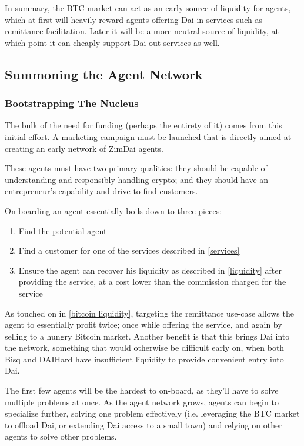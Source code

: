 \documentclass{article}
\begin{document}
In summary, the BTC market can act as an early source of liquidity for agents, which at first will heavily reward agents offering Dai-in services such as remittance facilitation. Later it will be a more neutral source of liquidity, at which point it can cheaply support Dai-out services as well.

\subsection{Summoning the Agent Network} \label{summoning}

\subsubsection{Bootstrapping The Nucleus} \label{bootstrapping}

The bulk of the need for funding (perhaps the entirety of it) comes from this initial effort. A marketing campaign must be launched that is directly aimed at creating an early network of ZimDai agents.

These agents must have two primary qualities: they should be capable of understanding and responsibly handling crypto; and they should have an entrepreneur's capability and drive to find customers.

On-boarding an agent essentially boils down to three pieces:

\begin{enumerate}
	\item Find the potential agent
	\item Find a customer for one of the services described in \ref{services}
	\item Ensure the agent can recover his liquidity as described in \ref{liquidity} after providing the service, at a cost lower than the commission charged for the service
\end{enumerate}

As touched on in \ref{bitcoin liquidity}, targeting the remittance use-case allows the agent to essentially profit twice; once while offering the service, and again by selling to a hungry Bitcoin market. Another benefit is that this brings Dai into the network, something that would otherwise be difficult early on, when both Bisq and DAIHard have insufficient liquidity to provide convenient entry into Dai.

The first few agents will be the hardest to on-board, as they'll have to solve multiple problems at once. As the agent network grows, agents can begin to specialize further, solving one problem effectively (i.e. leveraging the BTC market to offload Dai, or extending Dai access to a small town) and relying on other agents to solve other problems.
\end{document}
